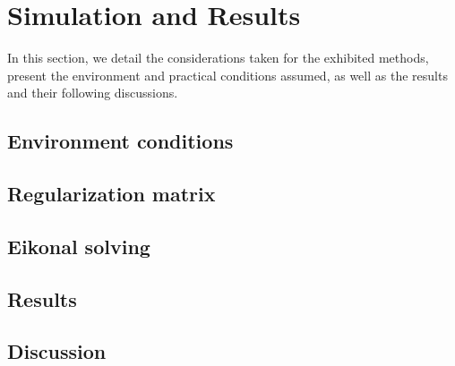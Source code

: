 \section{Simulation and Results}
\label{sec:simulation_and_results}

In this section, we detail the considerations taken for the exhibited methods, present the environment and practical conditions assumed, as well as the results and their following discussions.

\subsection{Environment conditions}

\subsection{Regularization matrix}

\subsection{Eikonal solving}

\subsection{Results}

\subsection{Discussion}